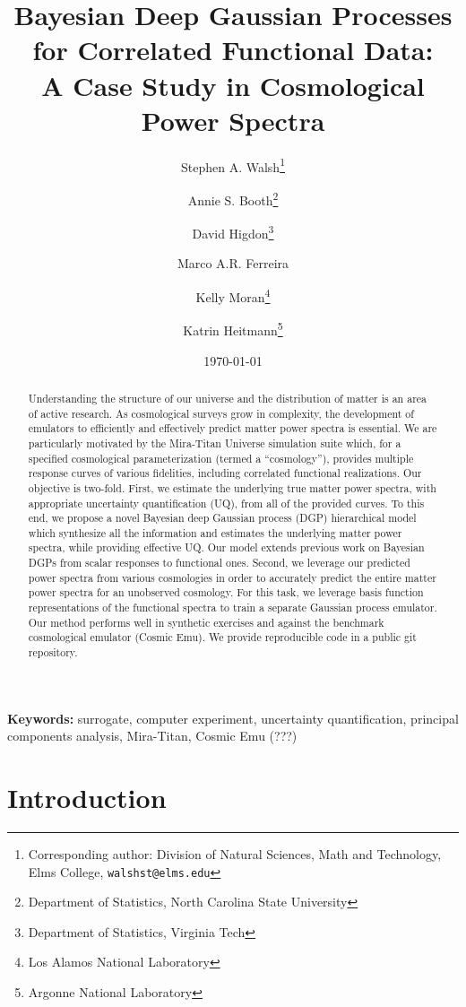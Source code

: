\documentclass[11pt]{article}
\title{Bayesian Deep Gaussian Processes for Correlated Functional Data: \\
        A Case Study in Cosmological Power Spectra}
\author{Stephen A. Walsh\thanks{Corresponding author: Division of Natural Sciences, 
        Math and Technology, Elms College, {\tt walshst@elms.edu}} \and 
        Annie S. Booth\thanks{Department of Statistics, North Carolina State University} \and
        David Higdon\thanks{Department of Statistics, Virginia Tech} \and
        Marco A.R. Ferreira\footnotemark[3] \and
        Kelly Moran\thanks{Los Alamos National Laboratory} \and
        Katrin Heitmann\thanks{Argonne National Laboratory}}
\date{\today}
\begin{document}
\maketitle
\bigskip

\begin{abstract} 
Understanding the structure of our universe and the distribution of matter is an 
area of active research.  As cosmological surveys grow in complexity, the development 
of emulators to efficiently and effectively predict matter power spectra is essential.  
We are particularly motivated by the Mira-Titan Universe simulation
suite which, for a specified cosmological parameterization (termed a ``cosmology''), 
provides multiple response curves of various fidelities, including correlated 
functional realizations.  Our objective is two-fold.  First, we estimate 
the underlying true matter power spectra, with appropriate uncertainty 
quantification (UQ), from all of the provided curves.  To this end, we propose a 
novel Bayesian deep Gaussian process (DGP) hierarchical model which synthesize 
all the information and estimates the underlying matter power spectra, while providing 
effective UQ.  Our model extends previous work on Bayesian DGPs from scalar responses 
to functional ones.  Second, we leverage our predicted power spectra from various 
cosmologies in order to accurately predict the entire matter power spectra for an 
unobserved cosmology.  For this task, we leverage basis function representations 
of the functional spectra to train a separate Gaussian process emulator.  
Our method performs well in synthetic exercises and against the benchmark cosmological 
emulator (Cosmic Emu).  We provide reproducible code in a public git repository.
\end{abstract}

\noindent \textbf{Keywords:} surrogate, computer experiment, uncertainty quantification,
principal components analysis, Mira-Titan, Cosmic Emu (???)


\section{Introduction}

\end{document}
